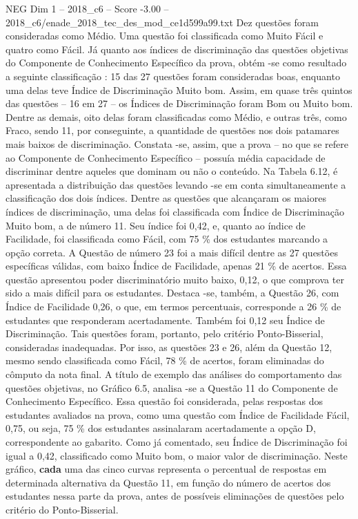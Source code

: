 \begin{textsample}{NEG Dim 1 – 2018\_c6 – Score -3.00 – 2018\_c6/enade\_2018\_tec\_des\_mod\_ce1d599a99.txt}
Dez questões foram consideradas como Médio.
Uma questão foi classificada como Muito Fácil e quatro como Fácil.
Já quanto aos índices de discriminação das questões objetivas do Componente de Conhecimento Específico da prova, obtém -se como resultado a seguinte classificação : 15 das 27 questões foram consideradas boas, enquanto uma delas teve Índice de Discriminação Muito bom.
Assim, em quase três quintos das questões – 16 em 27 – os Índices de Discriminação foram Bom ou Muito bom.
Dentre as demais, oito delas foram classificadas como Médio, e outras três, como Fraco, sendo 11, por conseguinte, a quantidade de questões nos dois patamares mais baixos de discriminação.
Constata -se, assim, que a prova – no que se refere ao Componente de Conhecimento Específico – possuía média capacidade de discriminar dentre aqueles que dominam ou não o conteúdo.
Na Tabela 6.12, é apresentada a distribuição das questões levando -se em conta simultaneamente a classificação dos dois índices.
Dentre as questões que alcançaram os maiores índices de discriminação, uma delas foi classificada com Índice de Discriminação Muito bom, a de número 11.
Seu índice foi 0,42, e, quanto ao índice de Facilidade, foi classificada como Fácil, com 75 \% dos estudantes marcando a opção correta.
A Questão de número 23 foi a mais difícil dentre as 27 questões específicas válidas, com baixo Índice de Facilidade, apenas 21 \% de acertos.
Essa questão apresentou poder discriminatório muito baixo, 0,12, o que comprova ter sido a mais difícil para os estudantes.
Destaca -se, também, a Questão 26, com Índice de Facilidade 0,26, o que, em termos percentuais, corresponde a 26 \% de estudantes que responderam acertadamente.
Também foi 0,12 seu Índice de Discriminação.
Tais questões foram, portanto, pelo critério Ponto-Bisserial, consideradas inadequadas.
Por isso, as questões 23 e 26, além da Questão 12, mesmo sendo classificada como Fácil, 78 \% de acertos, foram eliminadas do cômputo da nota final.
A título de exemplo das análises do comportamento das questões objetivas, no Gráfico 6.5, analisa -se a Questão 11 do Componente de Conhecimento Específico.
Essa questão foi considerada, pelas respostas dos estudantes avaliados na prova, como uma questão com Índice de Facilidade Fácil, 0,75, ou seja, 75 \% dos estudantes assinalaram acertadamente a opção D, correspondente ao gabarito.
Como já comentado, seu Índice de Discriminação foi igual a 0,42, classificado como Muito bom, o maior valor de discriminação.
Neste gráfico, \textbf{cada} uma das cinco curvas representa o percentual de respostas em determinada alternativa da Questão 11, em função do número de acertos dos estudantes nessa parte da prova, antes de possíveis eliminações de questões pelo critério do Ponto-Bisserial.

\end{textsample}
